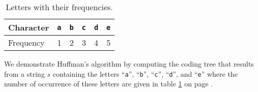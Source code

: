 \begin{table}[htbp]
  \centering
\begin{tabular}[t]{|l|r|r|r|r|r|}
\hline
Character  & \texttt{a} & \texttt{b} & \texttt{c} & \texttt{d} & \texttt{e} \\
\hline
\hline
Frequency &          1 &          2 &          3 &          4 &          5 \\
\hline
\end{tabular}
  \caption{Letters with their frequencies.}
  \label{tab:frequency}
\end{table}

We demonstrate Huffman's algorithm by computing  the coding tree that results from a string $s$ containing the
letters ``\texttt{a}'', ``\texttt{b}'', ``\texttt{c}'', ``\texttt{d}'', and ``\texttt{e}'' where the number of
occurrence of these letters are given in table \ref{tab:frequency} on page \pageref{tab:frequency}.
